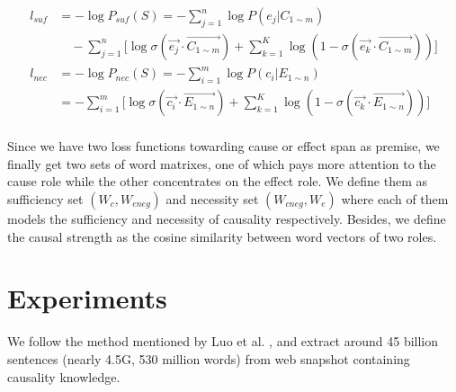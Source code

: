 \documentclass[conference]{IEEEtran}
\newenvironment{sequation}  
{\small\begin{equation}}  
{\end{equation}}
\begin{document}
\begin{spacing}{0.6}
\begin{sequation}
\begin{aligned}
l_{suf} &= -\log P_{suf}(S) = - \sum_{j=1}^{n}{\log P(e_j|C_{1 \sim m})} \\
& \quad-\sum_{j=1}^{n}{[\log\sigma(\overrightarrow{e_j} \cdot \overrightarrow{C_{1 \sim m}})} + \sum_{k=1}^{K}{\log(1 - \sigma(\overrightarrow{e_k} \cdot \overrightarrow{C_{1 \sim m}}))}]\\	
l_{nec} &= -\log P_{nec}(S) = -\sum_{i=1}^{m}{\log P(c_i|E_{1 \sim n})} \\
&= -\sum_{i=1}^{m}{[\log\sigma(\overrightarrow{c_i} \cdot \overrightarrow{E_{1 \sim n}})} + \sum_{k=1}^{K}{\log(1 - \sigma(\overrightarrow{c_k} \cdot \overrightarrow{E_{1 \sim n}}))}] \\
\end{aligned}
\end{sequation}
\end{spacing}

Since we have two loss functions towarding cause or effect span as premise, we finally get two sets of word matrixes, one of which pays more attention to the cause role while the other concentrates on the effect role. We define them as sufficiency set $(W_c, W_{eneg})$ and necessity set $(W_{cneg}, W_e)$ where each of them models the sufficiency and necessity of causality respectively.
Besides, we define the causal strength as the cosine similarity between word vectors of two roles.


\section{Experiments}
We follow the method mentioned by Luo et al. \cite{kr2016}, and extract around 45 billion sentences (nearly 4.5G, 530 million words) from web snapshot containing causality knowledge. 
\end{document}
